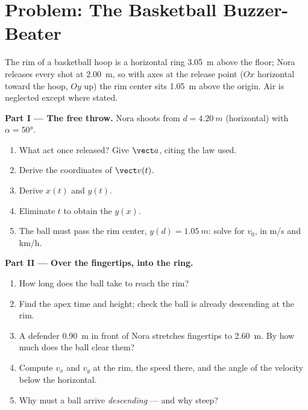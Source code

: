 \section{Problem: The Basketball Buzzer-Beater}

\begin{problem}
\label{pb:g12:projectile-motion:1}
The rim of a basketball hoop is a horizontal ring \qty{3.05}{m} above the
floor; Nora releases every shot at \qty{2.00}{m}, so with axes at the
release point ($Ox$ horizontal toward the hoop, $Oy$ up) the rim center
sits \qty{1.05}{m} above the origin. Air is neglected except where stated.

\medskip\noindent\textbf{Part I --- The free throw.} Nora shoots from
$d = \qty{4.20}{m}$ (horizontal) with  $\alpha = \ang{50}$.
\begin{enumerate}
  \item What  act once released? Give $\vect a$, citing the law used.
  \item Derive the coordinates of $\vect v(t)$.
  \item Derive $x(t)$ and $y(t)$.
  \item Eliminate $t$ to obtain the  $y(x)$.
  \item The ball must pass the rim center, $y(d) = \qty{1.05}{m}$: solve
        for $v_0$, in \unit{m/s} and \unit{km/h}.
\end{enumerate}

\medskip\noindent\textbf{Part II --- Over the fingertips, into the ring.}
\begin{enumerate}[resume]
  \item How long does the ball take to reach the rim?
  \item Find the apex time and height; check the ball is already
        descending at the rim.
  \item A defender \qty{0.90}{m} in front of Nora stretches fingertips to
        \qty{2.60}{m}. By how much does the ball clear them?
  \item Compute $v_x$ and $v_y$ at the rim, the speed there, and the angle
        of the velocity below the horizontal.
  \item Why must a ball arrive \emph{descending} --- and why steep?
\end{enumerate}


\end{problem}
